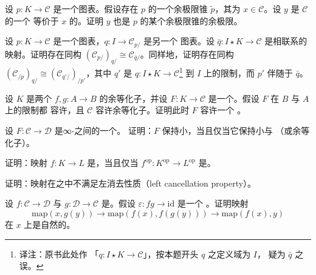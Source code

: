 \begin{exercise}\label{ex:colimit-equivalent-object}
设 $p\colon K \to \mathcal{C}$ 是一个图表。假设存在 $p$ 的一个余极限锥
$\tilde{p}$，其\trColimit{}为 $x \in \mathcal{C}$。设 $y$ 是 $\mathcal{C}$ 的一个
等价于 $x$ 的\trObject{}。证明 $y$ 也是 $p$ 的某个余极限锥的余极限。
\end{exercise}

\begin{exercise}\label{ex:slice-iso-adjoint}
设 $p\colon K \to \mathcal{C}$ 是一个图表，$q\colon I \to \mathcal{C}_{p/}$ 是另一个
图表。设 $\bar{q}\colon I \star K \to \mathcal{C}$ 是相联系的映射。证明存在同构
$(\mathcal{C}_{p/})_{q/} \cong \mathcal{C}_{\bar{q}/}$。同样地，证明存在同构
$(\mathcal{C}_{/p})_{q/} \cong (\mathcal{C}_{q'/})_{/p'}$，其中 $q'$ 是
$q\colon I \star K \to \mathcal{C}$\footnote{译注：原书此处作
「$q\colon I \star K \to \mathcal{C}$」，按本题开头 $q$ 之定义域为 $I$，
疑为 $\bar{q}$ 之误。} 到 $I$ 上的限制，而 $p'$ 伴随于 $\bar{q}$。
\end{exercise}

\begin{exercise}\label{ex:colimit-coequalizer}
设 $K$ 是两个\trMonomorphism{} $f, g\colon A \to B$ 的余等化子，并设
$F\colon K \to \mathcal{C}$ 是一个\trFunctor{}。假设 $F$ 在 $B$ 与 $A$ 上的限制都
容许\trColimit{}，且 $\mathcal{C}$ 容许余等化子。证明此时 $F$ 容许一个%
\trColimit{}。
\end{exercise}

\begin{exercise}\label{ex:preserves-small-colimits}
设 $F\colon \mathcal{C} \to \mathcal{D}$ 是∞-\trCategories{}之间的一个\trFunctor{}。
证明：$F$ 保持小\trColimit{}，当且仅当它保持小\trCoproduct{}与\trPushout{}%
（或余等化子）。
\end{exercise}

\begin{exercise}\label{ex:cofinal-coinitial-op}
证明：映射 $f\colon K \to L$ 是\trCofinal{}，当且仅当
$f^{\mathrm{op}}\colon K^{\mathrm{op}} \to L^{\mathrm{op}}$ 是\trCoinitial{}。
\end{exercise}

\begin{exercise}\label{ex:left-anodyne-no-cancellation}
证明：\trLeftAnodyne{}映射在\trMonomorphism{}之中不满足左消去性质（left cancellation
property）。
\end{exercise}

\begin{exercise}\label{ex:epsilon-natural-in-x}
设 $f\colon \mathcal{C} \to \mathcal{D}$ 与 $g\colon \mathcal{D} \to \mathcal{C}$
是\trFunctor{}。假设 $\varepsilon\colon fg \to \mathrm{id}$ 是一个%
\trNaturalTransformation{}。证明映射
\[
\mathrm{map}(x, g(y)) \to \mathrm{map}(f(x), f(g(y))) \to \mathrm{map}(f(x), y)
\]
在 $x$ 上是自然的。
\end{exercise}

